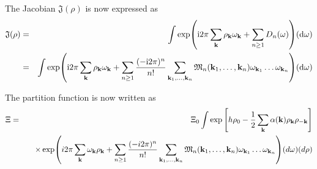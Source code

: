 The Jacobian $\mathfrak{J}(\rho)$ is now expressed as
\begin{eqnarray}
	\mathfrak{J}(\rho) &=& \int \exp({\rm i} 2\pi \sum_{\vb k}\rho_{\vb k}\omega_{\vb k} + \sum_{n\geq 1} D_n(\omega) ) ({\rm d} \omega)
	\nonumber\\
	&=& \int \exp({\rm i} 2\pi \sum_{\vb k}\rho_{\vb k}\omega_{\vb k} 
	+ \sum_{n\geq 1} \frac{(-{\rm i}2\pi)^n}{n!}\sum_{\vb{k}_1,\dotsc,\vb{k}_n}\mathfrak{M}_n(\vb k_1, \dotsc, \vb k_n) \omega_{{\vb k}_1}\dotsc \omega_{{\vb k}_n}) ({\rm d} \omega)
\end{eqnarray}

The partition function is now written as
\begin{eqnarray}
	\Xi &=& \Xi_0 \int \exp \left[h \rho_0 - \frac12
	\sum\limits_{\bf k} \alpha(\vb k) \rho_{\bf k}\rho_{-{\bf k}} \right]
	\\
	&&
	\quad \times
	\exp (i2\pi \sum\limits_{\bf k} \omega_{\bf k} \rho_{\bf k} + \sum_{n\ge 1} \frac{(-i2\pi)^n}{n!}\sum_{\vb{k}_1,\dotsc,\vb{k}_n} {\mathfrak M}_n(\vb{k}_1,\dotsc,\vb{k}_n) \omega_{\vb k_1}\dotsc\omega_{\vb{k}_n})
	(d\omega) (d\rho) \nonumber
\end{eqnarray}
